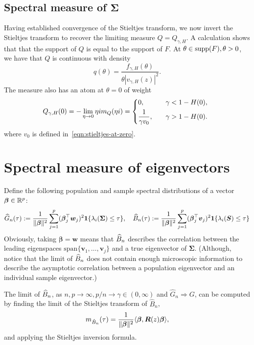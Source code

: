 \documentclass{article}
\newcommand{\bv}{\boldsymbol{v}}
\newcommand{\bw}{\boldsymbol{w}}
\newcommand{\bbeta}{\boldsymbol{\beta}}
\newcommand{\bSigma}{\boldsymbol{\Sigma}}
\newcommand{\bS}{\boldsymbol{S}}
\newcommand{\bR}{\boldsymbol{R}}
\newcommand{\convweak}{\Rightarrow}
\begin{document}
\subsection{Spectral measure of $\bSigma$}
Having established convergence of the Stieltjes transform, we now invert the Stieltjes transform to recover the limiting measure $Q = Q_{\gamma,H}$. A calculation shows that that the support of $Q$ is equal to the support of $F$. At $\theta \in \mathrm{supp}(F), \theta > 0$, we have that $Q$ is continuous with density
\begin{equation}
	\label{eqn:spectral-measure-covariance-density}
	q(\theta) = \frac{f_{\gamma,H}(\theta)}{\theta |v_{\gamma,H}(z)|^2}.
\end{equation}
The measure also has an atom at $\theta = 0$ of weight
\begin{equation}
	\label{eqn:spectral-measure-covariance-atom-at-zero}
	Q_{\gamma,H}(0) = - \lim_{\eta \to 0} \eta i m_Q(\eta i) = 
	\begin{dcases*}
		0, & \quad \textrm{$\gamma < 1 - H(0)$}, \\
		\frac{1}{\gamma v_0}, & \quad \textrm{$\gamma > 1 - H(0)$}.
	\end{dcases*} 
\end{equation}
where $v_0$ is defined in~\eqref{eqn:stieltjes-at-zero}.

\section{Spectral measure of eigenvectors}
Define the following population and sample spectral distributions of a vector $\bbeta \in \Reals^p$:
$$
\wh{G}_n(\tau) := \frac{1}{\|\bbeta\|^2} \sum_{j = 1}^{p} (\bbeta_j^{\top} \bw_j)^2 \1\{\lambda_i(\bSigma) \leq \tau\}, \quad \wh{B}_n(\tau) := \frac{1}{\|\bbeta\|^2} \sum_{j = 1}^{p} (\bbeta_j^{\top} \bv_j)^2 \1\{\lambda_i(\bS) \leq \tau\}
$$ 
Obviously, taking $\bbeta = \bw$ means that $\widehat{B}_n$ describes the correlation between the leading eigenspaces $\mathrm{span}\{\bv_1,\ldots,\bv_j\}$ and a true eigenvector of $\bSigma$. (Although, notice that the limit of $\widehat{B}_n$ does not contain enough microscopic information to describe the asymptotic correlation between a population eigenvector and an individual sample eigenvector.)

The limit of $\widehat{B}_n$, as $n,p \to \infty, p/n \to \gamma \in (0,\infty)$ and $\hat{G}_n \convweak G$, can be computed by finding the limit of the Stieltjes transform of $\hat{B}_n$, 
\begin{equation}
	\label{eqn:spectral-density-stieltjes}
	m_{\hat{B}_n}(\tau) = \frac{1}{\|\bbeta\|^2} \dotp{\bbeta}{\bR(z) \bbeta},
\end{equation}
and applying the Stieltjes inversion formula. %
\end{document}
